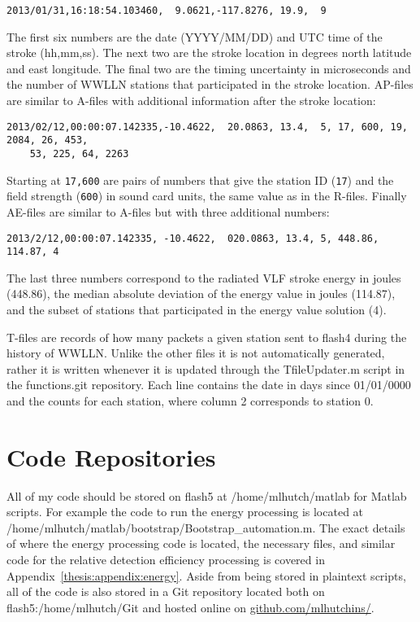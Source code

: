 \begin{verbatim}
2013/01/31,16:18:54.103460,  9.0621,-117.8276, 19.9,  9
\end{verbatim}

The first six numbers are the date (YYYY/MM/DD) and UTC time of the stroke (hh,mm,ss).
The next two are the stroke location in degrees north latitude and east longitude.
The final two are the timing uncertainty in microseconds and the number of WWLLN stations that participated in the stroke location.
AP-files are similar to A-files with additional information after the stroke location:

\begin{verbatim}
2013/02/12,00:00:07.142335,-10.4622,  20.0863, 13.4,  5, 17, 600, 19, 2084, 26, 453, 
	53, 225, 64, 2263
\end{verbatim}

Starting at \verb|17,600| are pairs of numbers that give the station ID (\verb|17|) and the field strength (\verb|600|) in sound card units, the same value as in the R-files. Finally AE-files are similar to A-files but with three additional numbers:

\begin{verbatim}
2013/2/12,00:00:07.142335, -10.4622,  020.0863, 13.4, 5, 448.86, 114.87, 4
\end{verbatim}

The last three numbers correspond to the radiated VLF stroke energy in joules (448.86), the median absolute deviation of the energy value in joules (114.87), and the subset of stations that participated in the energy value solution (4).

T-files are records of how many packets a given station sent to flash4 during the history of WWLLN.
Unlike the other files it is not automatically generated, rather it is written whenever it is updated through the TfileUpdater.m script in the functions.git repository.
Each line contains the date in days since 01/01/0000 and the counts for each station, where column 2 corresponds to station 0.

\section{Code Repositories}

All of my code should be stored on flash5 at /home/mlhutch/matlab for Matlab scripts.
For example the code to run the energy processing is located at /home/mlhutch/matlab/bootstrap/Bootstrap\_automation.m.
The exact details of where the energy processing code is located, the necessary files, and similar code for the relative detection efficiency processing is covered in Appendix~\ref{thesis:appendix:energy}.
Aside from being stored in plaintext scripts, all of the code is also stored in a Git repository located both on flash5:/home/mlhutch/Git and hosted online on \href{http://github.com/mlhutchins}{github.com/mlhutchins/}.

